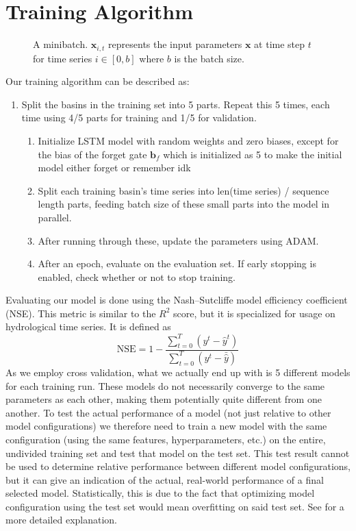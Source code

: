 \section{Training Algorithm}
\begin{figure}
\centering

\caption{A minibatch. $\bm{x}_{i,t}$ represents the input parameters $\bm{x}$ at time step $t$ for time series $i \in [0, b]$ where $b$ is the batch size.}
\label{minibatch}
\end{figure}
Our training algorithm can be described as:
\begin{enumerate}
    \item Split the basins in the training set into 5 parts. Repeat this 5 times, each time using 4/5 parts for training and 1/5 for validation.\begin{enumerate}
        \item Initialize LSTM model with random weights and zero biases, except for the bias of the forget gate $\bm{b}_f$ which is initialized as 5 to make the initial model either forget or remember idk \citationneeded
        \item Split each training basin's time series into len(time series) / sequence length parts, feeding batch size of these small parts into the model in parallel. 
        \item After running through these, update the parameters using ADAM.
        \item After an epoch, evaluate on the evaluation set. If early stopping is enabled, check whether or not to stop training.
    \end{enumerate}
\end{enumerate}
Evaluating our model is done using the Nash–Sutcliffe model efficiency coefficient (NSE). \cite{NSE}
This metric is similar to the $R^2$ score, but it is specialized for usage 
on hydrological time series.
It is defined as 
\begin{equation}
    \text{NSE} = 1 - \frac{\sum_{t=0}^T\left( y^t - \hat{y}^t\right)}{\sum_{t=0}^T\left(y^t - \bar{\hat{y}}\right)} \label{NSE}
\end{equation}
As we employ cross validation, what we actually end up with is 5 different models 
for each training run. These models do not necessarily converge to the same parameters 
as each other, making them potentially quite different from one another. To test the 
actual performance of a model (not just relative to other model configurations) we 
therefore need to train a new model with the same configuration (using the same features, 
hyperparameters, etc.) on the entire, undivided training set and test that model 
on the test set. This test result cannot be used to determine relative performance 
between different model configurations, but it can give an indication of the actual, 
real-world performance of a final selected model. Statistically, this is due to the 
fact that optimizing model configuration using the test set would mean overfitting 
on said test set. See \cite{elemstatlearn} for a more detailed explanation.

